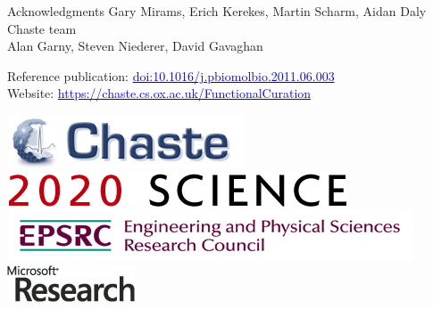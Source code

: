 \documentclass[t,xcolor={usenames,dvipsnames}]{beamer}
\newcommand{\myhref}[2]{\href{#1}{\textcolor{Blue}{#2}}}
\newcommand{\myurl}[1]{\myhref{#1}{#1}}
\newcommand{\subitem}[1]{\begin{itemize}[<.->]\item #1 \end{itemize}}
\newcommand{\doi}[1]{\myhref{http://dx.doi.org/#1}{doi:#1}}
\begin{document}


\begin{frame}{Acknowledgments}
Gary Mirams, Erich Kerekes, Martin Scharm, Aidan Daly\\
Chaste team\\
Alan Garny, Steven Niederer, David Gavaghan

Reference publication: \doi{10.1016/j.pbiomolbio.2011.06.003}\\
Website: \myurl{https://chaste.cs.ox.ac.uk/FunctionalCuration}

\begin{center}
\includegraphics[scale=.9]{chaste-266x60}\\ \vspace{.3cm}
\includegraphics[scale=.7]{logo2020science}\\ \vspace{.4cm}
\includegraphics[width=.55\textwidth]{EPSRC1RGBLO} \hspace{.1cm}
\includegraphics[scale=.55]{logo_msr}
\end{center}
\end{frame}
\end{document}
